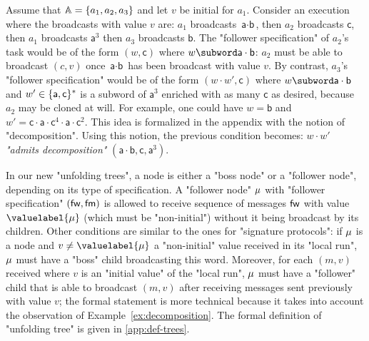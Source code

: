 \begin{example}

\label{ex:decomposition}
Assume that $\mathbb{A} = \{a_1,a_2,a_3\}$ and let $v$ be initial for $a_1$. Consider an execution where the broadcasts with value $v$ are: $a_1$ broadcasts $\textsf{a} \cdot \textsf{b}$, then $a_2$ broadcasts $\textsf{c}$, then $a_1$ broadcasts $\textsf{a}^3$ then $a_3$ broadcasts $\textsf{b}$. The "follower specification" of $a_2$'s task would be of the form $(w, \textsf{c})$ where $w \subword \textsf{a} \cdot \textsf{b}$: $a_2$ must be able to broadcast $(c,v)$ once $\textsf{a} \cdot \textsf{b}$ has been broadcast with value $v$. By contrast, $a_3$'s "follower specification" would be of the form $(w \cdot w', \textsf{c})$ where $w \subword \textsf{a} \cdot \textsf{b}$ and $w' \in \{\textsf{a},\textsf{c}\}^*$ is a subword of $\textsf{a}^3$ enriched with as many $\textsf{c}$ as desired, because $a_2$ may be cloned at will.
For example, one could have $w= \textsf{b} $ and $w' = \textsf{c} \cdot \textsf{a} \cdot \textsf{c}^4 \cdot \textsf{a} \cdot \textsf{c}^2$. This idea is formalized in the appendix with the notion of "decomposition". Using this notion, the previous condition becomes: $w \cdot w'$ \emph{"admits decomposition"} $(\textsf{a} \cdot \textsf{b}, \textsf{c}, \textsf{a}^3)$.   
\end{example}

In our new "unfolding trees", a node is either a "boss node" or a "follower node", depending on its type of specification. 
A "follower node" $\mu$ with "follower specification" $(\mathsf{fw}, \mathsf{fm})$ is allowed to receive sequence of messages $\mathsf{fw}$ with value $\valuelabel{\node}$ (which must be "non-initial") without it being broadcast by its children. 
Other conditions are similar to the ones for "signature protocols": if $\mu$ is a node and $v \ne \valuelabel{\node}$ a "non-initial" value received in its "local run", $\mu$ must have a "boss" child broadcasting this word. Moreover, for each $(m,v)$ received where $v$ is an "initial value" of the "local run", $\mu$ must have a "follower" child that is able to broadcast $(m,v)$ after receiving messages sent previously with value $v$; the formal statement is more technical because it takes into account the observation of Example~\ref{ex:decomposition}. 
The formal definition of "unfolding tree" is given in \cref{app:def-trees}.


